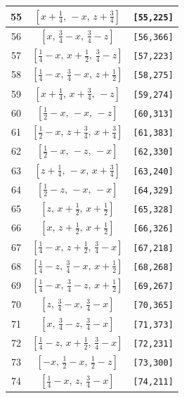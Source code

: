 \documentclass[fleqn,8pt]{jsarticle}
\begin{document}
\begin{longtable}{ccc}
55 & $\left[ x + \frac{1}{4},\, - x,\, z + \frac{3}{4} \right]$ & {\tt [55,225]} \\ \hline
56 & $\left[ x,\, \frac{3}{4} - x,\, \frac{3}{4} - z \right]$ & {\tt [56,366]} \\ \hline
57 & $\left[ \frac{1}{4} - x,\, x + \frac{1}{2},\, \frac{3}{4} - z \right]$ & {\tt [57,223]} \\ \hline
58 & $\left[ \frac{1}{4} - x,\, \frac{3}{4} - x,\, z + \frac{1}{2} \right]$ & {\tt [58,275]} \\ \hline
59 & $\left[ x + \frac{1}{4},\, x + \frac{3}{4},\, - z \right]$ & {\tt [59,274]} \\ \hline
60 & $\left[ \frac{1}{2} - x,\, - x,\, - z \right]$ & {\tt [60,313]} \\ \hline
61 & $\left[ \frac{1}{2} - x,\, z + \frac{3}{4},\, x + \frac{3}{4} \right]$ & {\tt [61,383]} \\ \hline
62 & $\left[ \frac{1}{2} - x,\, - z,\, - x \right]$ & {\tt [62,330]} \\ \hline
63 & $\left[ z + \frac{1}{4},\, - x,\, x + \frac{3}{4} \right]$ & {\tt [63,240]} \\ \hline
64 & $\left[ \frac{1}{2} - z,\, - x,\, - x \right]$ & {\tt [64,329]} \\ \hline
65 & $\left[ z,\, x + \frac{1}{2},\, x + \frac{1}{2} \right]$ & {\tt [65,328]} \\ \hline
66 & $\left[ x,\, z + \frac{1}{2},\, x + \frac{1}{2} \right]$ & {\tt [66,326]} \\ \hline
67 & $\left[ \frac{1}{4} - x,\, z + \frac{1}{2},\, \frac{3}{4} - x \right]$ & {\tt [67,218]} \\ \hline
68 & $\left[ \frac{1}{4} - z,\, \frac{3}{4} - x,\, x + \frac{1}{2} \right]$ & {\tt [68,268]} \\ \hline
69 & $\left[ \frac{1}{4} - x,\, \frac{3}{4} - z,\, x + \frac{1}{2} \right]$ & {\tt [69,267]} \\ \hline
70 & $\left[ z,\, \frac{3}{4} - x,\, \frac{3}{4} - x \right]$ & {\tt [70,365]} \\ \hline
71 & $\left[ x,\, \frac{3}{4} - z,\, \frac{3}{4} - x \right]$ & {\tt [71,373]} \\ \hline
72 & $\left[ \frac{1}{4} - z,\, x + \frac{1}{2},\, \frac{3}{4} - x \right]$ & {\tt [72,231]} \\ \hline
73 & $\left[ - x,\, \frac{1}{2} - x,\, \frac{1}{2} - z \right]$ & {\tt [73,300]} \\ \hline
74 & $\left[ \frac{1}{4} - x,\, z,\, \frac{3}{4} - x \right]$ & {\tt [74,211]} \\ \hline

\end{longtable}
\end{document}
